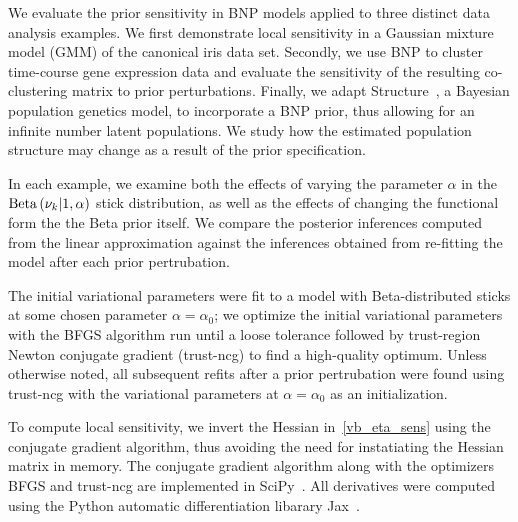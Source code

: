We evaluate the prior sensitivity in BNP models applied to three distinct data analysis examples.
We first demonstrate local sensitivity in a Gaussian mixture model (GMM) of the canonical iris data set.
Secondly, we use BNP to cluster time-course gene expression data
and evaluate the sensitivity of the resulting co-clustering matrix to prior perturbations.
Finally, we adapt Structure~\citep{pritchard:2000:structure}, a Bayesian population genetics model,
to incorporate a BNP prior, thus allowing for
an infinite number latent populations.
We study how the estimated population structure may change as a
result of the prior specification.

In each example, we examine both the effects of varying the parameter $\alpha$
in the $\mathrm{Beta}\left(\nu_{k} \vert 1, \alpha\right)$ stick distribution, as well as
the effects of changing the functional form the the Beta prior itself.
We compare the posterior inferences computed from the linear approximation against
the inferences obtained from re-fitting the model after each prior pertrubation.

The initial variational parameters were fit to a model
with Beta-distributed sticks at some chosen parameter $\alpha = \alpha_0$;
we optimize the initial variational parameters with
the BFGS algorithm run until a loose tolerance
followed by trust-region Newton conjugate gradient (trust-ncg) to find a high-quality optimum.
Unless otherwise noted, all subsequent refits after a prior pertrubation were found
using trust-ncg with the variational parameters at $\alpha = \alpha_0$ as an initialization.

To compute local sensitivity, we invert the Hessian in~\eqref{vb_eta_sens} using
the conjugate gradient algorithm, thus avoiding the need for
instatiating the Hessian matrix in memory.
The conjugate gradient algorithm along with the optimizers BFGS and trust-ncg
are implemented in SciPy~\citep{scipy}.
All derivatives were computed using the Python
automatic differentiation libarary Jax~\citep{jax2018github}.

